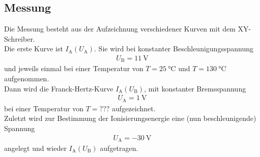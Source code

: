 \clearpage

\subsection{Messung}
Die Messung besteht aus der Aufzeichnung verschiedener Kurven mit dem XY-Schreiber. \\
Die erste Kurve ist $I_\text{A}(U_\text{A})$. Sie wird bei konstanter Beschleunigungsspannung
\begin{align}
	U_\text{B} = \SI{11}{\volt}
\end{align}
und jeweils einmal bei einer Temperatur von $T=\SI{25}{\celsius}$ und $T=\SI{130}{\celsius}$ aufgenommen. \\
Dann wird die Franck-Hertz-Kurve $I_\text{A}(U_\text{B})$, mit konstanter Bremsspannung
\begin{align}
	U_\text{A} = \SI{1}{\volt}
\end{align}
bei einer Temperatur von $T = ???$ aufgezeichnet. \\
Zuletzt wird zur Bestimmung der Ionisierungsenergie eine (nun beschleunigende) Spannung
\begin{align}
	U_\text{A} = \SI{-30}{\volt}
\end{align}
angelegt und wieder $I_\text{A}(U_\text{B})$ aufgetragen.